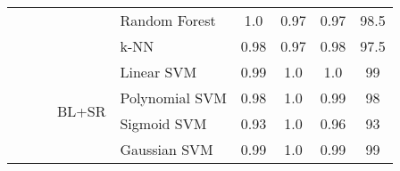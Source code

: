 \documentclass[sn-mathphys]{sn-jnl}%
\theoremstyle{thmstyleone}%
\theoremstyle{thmstyletwo}%
\theoremstyle{thmstylethree}%
\begin{document}
\begin{table*}[]
{\begin{tabular}{|l|l|c|c|l|c|c|c|c|}
                    &                          &                                                  &                                                                                                     
                    & Random Forest       & 1.0                                     & 0.97                                 & 0.97                                   & 98.5                                       \\ \cline{5-9} 
                    &                          &                                                  &                               
                    & k-NN                & 0.98                                    & 0.97                                 & 0.98                                   & 97.5                                       \\ \cline{4-9} 
                    &                          &                                                  & \multirow{6}{*}{BL+SR}                                                                              & Linear SVM          & 0.99                                    & 1.0                                  & 1.0                                    & 99                                         \\ \cline{5-9} 
                    &                          &                                                  &                                                                                                     & Polynomial SVM      & 0.98                                    & 1.0                                  & 0.99                                   & 98                                         \\ \cline{5-9} 
                    &                          &                                                  &                                                                                                     & Sigmoid SVM         & 0.93                                    & 1.0                                  & 0.96                                   & 93                                         \\ \cline{5-9} 
                    &                          &                                                  &                                                                                                     & Gaussian SVM        & 0.99                                    & 1.0                                  & 0.99                                   & 99                                         \\ \cline{5-9} 

\end{tabular}}
\end{table*}
\end{document}
